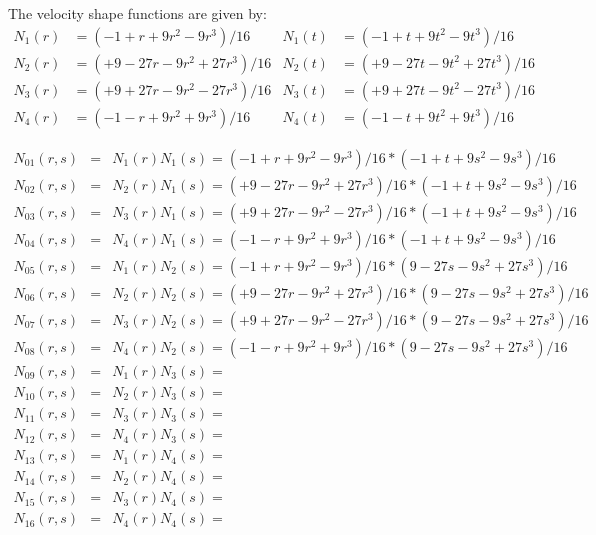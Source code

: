 The velocity shape functions are given by:
\begin{align}
N_1(r)&=(-1   +r +9r^2 - 9r^3)/16 & 
N_1(t)&=(-1   +t +9t^2 - 9t^3)/16 \nonumber\\
N_2(r)&=(+9 -27r -9r^2 +27r^3)/16 &
N_2(t)&=(+9 -27t -9t^2 +27t^3)/16 \nonumber\\
N_3(r)&=(+9 +27r -9r^2 -27r^3)/16 &
N_3(t)&=(+9 +27t -9t^2 -27t^3)/16 \nonumber\\
N_4(r)&=(-1   -r +9r^2 + 9r^3)/16 &
N_4(t)&=(-1   -t +9t^2 + 9t^3)/16 \nonumber
\end{align}


\begin{mdframed}[backgroundcolor=blue!5]
\begin{eqnarray}
N_{01}(r,s)&=&N_1(r)N_1(s) = (-1   +r +9r^2 - 9r^3)/16 * (-1  +t +9s^2 - 9s^3)/16 \nonumber\\
N_{02}(r,s)&=&N_2(r)N_1(s) = (+9 -27r -9r^2 +27r^3)/16 * (-1  +t +9s^2 - 9s^3)/16 \nonumber\\
N_{03}(r,s)&=&N_3(r)N_1(s) = (+9 +27r -9r^2 -27r^3)/16 * (-1  +t +9s^2 - 9s^3)/16 \nonumber\\
N_{04}(r,s)&=&N_4(r)N_1(s) = (-1   -r +9r^2 + 9r^3)/16 * (-1  +t +9s^2 - 9s^3)/16 \nonumber\\
N_{05}(r,s)&=&N_1(r)N_2(s) = (-1   +r +9r^2 - 9r^3)/16 * (9 -27s -9s^2 +27s^3)/16 \nonumber\\
N_{06}(r,s)&=&N_2(r)N_2(s) = (+9 -27r -9r^2 +27r^3)/16 * (9 -27s -9s^2 +27s^3)/16 \nonumber\\
N_{07}(r,s)&=&N_3(r)N_2(s) = (+9 +27r -9r^2 -27r^3)/16 * (9 -27s -9s^2 +27s^3)/16 \nonumber\\
N_{08}(r,s)&=&N_4(r)N_2(s) = (-1   -r +9r^2 + 9r^3)/16 * (9 -27s -9s^2 +27s^3)/16 \nonumber\\
N_{09}(r,s)&=&N_1(r)N_3(s) =\\
N_{10}(r,s)&=&N_2(r)N_3(s) =\\
N_{11}(r,s)&=&N_3(r)N_3(s) =\\
N_{12}(r,s)&=&N_4(r)N_3(s) =\\
N_{13}(r,s)&=&N_1(r)N_4(s) =\\
N_{14}(r,s)&=&N_2(r)N_4(s) =\\
N_{15}(r,s)&=&N_3(r)N_4(s) =\\
N_{16}(r,s)&=&N_4(r)N_4(s) =
\end{eqnarray}
\end{mdframed}

